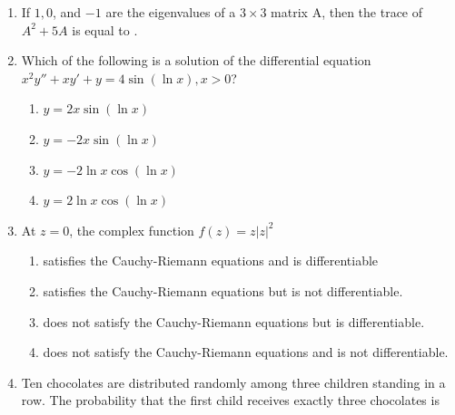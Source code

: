 \documentclass[a4paper,10pt]{article}
\begin{document}
\begin{enumerate}
    \item If $1, 0$, and $-1$ are the eigenvalues of a $3\times3$ matrix A, then the trace of $A^2 + 5A$ is equal to \underline{\hspace{2cm}}.
    
    \hfill{}

    \item Which of the following is a solution of the differential equation $x^2y''+ xy'+ y = 4\sin(\ln x), x > 0$?
    
    \hfill{}
    \begin{enumerate}[label=\Alph*)]
        \item $y = 2x \sin(\ln x)$
        \item $y = -2x \sin(\ln x)$
        \item $y = -2\ln x \cos(\ln x)$
        \item $y = 2\ln x \cos(\ln x)$
    \end{enumerate}
    
    \item At $z=0$, the complex function $f(z)=z|z|^2$
    
    \hfill{}
    \begin{enumerate}[label=\Alph*)]
        \item satisfies the Cauchy-Riemann equations and is differentiable
        \item satisfies the Cauchy-Riemann equations but is not differentiable.
        \item does not satisfy the Cauchy-Riemann equations but is differentiable.
        \item does not satisfy the Cauchy-Riemann equations and is not differentiable.
    \end{enumerate}
    
    \item Ten chocolates are distributed randomly among three children standing in a row. The probability that the first child receives exactly three chocolates is
    
    \hfill{}
    \begin{enumerate}[label=\Alph*)]
    \end{enumerate}


\end{enumerate}
\end{document}
